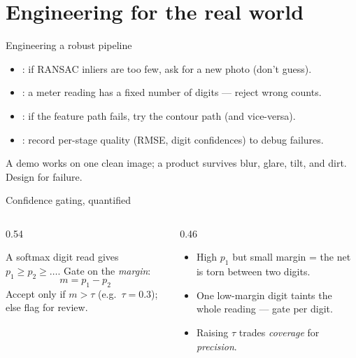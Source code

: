 \documentclass[10pt,aspectratio=169]{beamer}
\begin{document}
\section{Engineering for the real world}

\begin{frame}{Engineering a robust pipeline}
  \begin{itemize}
    \item {}: if RANSAC inliers are too few, ask for a new photo (don't guess).
    \item {}: a meter reading has a fixed number of digits — reject wrong counts.
    \item {}: if the feature path fails, try the contour path (and vice-versa).
    \item {}: record per-stage quality (RMSE, digit confidences) to debug failures.
  \end{itemize}
  \begin{badbox}
    A demo works on one clean image; a product survives blur, glare, tilt, and dirt. Design for failure.
  \end{badbox}
\end{frame}

\begin{frame}{Confidence gating, quantified}
  \begin{columns}[T]
    \begin{column}{0.54\textwidth}
      \begin{mathbox}
        A softmax digit read gives $p_1 \ge p_2 \ge \dots$. Gate on the \emph{margin}:
        \[ m = p_1 - p_2 \]
        Accept only if $m > \tau$ (e.g.\ $\tau=0.3$); else flag for review.
      \end{mathbox}
    \end{column}
    \begin{column}{0.46\textwidth}
      \begin{itemize}
        \item High $p_1$ but small margin = the net is torn between two digits.
        \item One low-margin digit taints the whole reading — gate per digit.
        \item Raising $\tau$ trades \emph{coverage} for \emph{precision}.
      \end{itemize}
    \end{column}
  \end{columns}
\end{frame}
\end{document}
